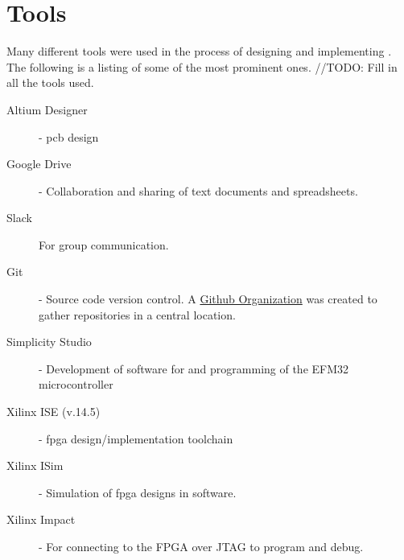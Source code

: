 \chapter{Tools}

Many different tools were used in the process of designing and implementing \vthreek.
The following is a listing of some of the most prominent ones.
//TODO: Fill in all the tools used.

\begin{description}
    \item[Altium Designer] - \gls{pcb} design
    \item[Google Drive] - Collaboration and sharing of text documents and spreadsheets.
    \item[Slack] For group communication.
    \item[Git] - Source code version control. A \href{https://github.com/DMPRO-2015-vector-graphics}{Github Organization} was created to gather repositories in a central location.
    \item[Simplicity Studio] - Development of software for and programming of the EFM32 microcontroller
    \item[Xilinx ISE (v.14.5)] - \gls{fpga} design/implementation toolchain
    \item[Xilinx ISim] - Simulation of \gls{fpga} designs in software.
    \item[Xilinx Impact] - For connecting to the FPGA over JTAG to program and debug.
\end{description}
